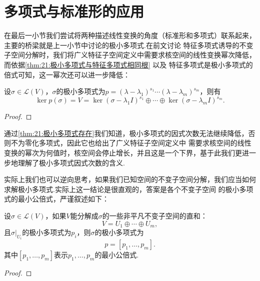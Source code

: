 \section{多项式与标准形的应用}
在最后一小节我们尝试将两种描述线性变换的角度（标准形和多项式）联系起来，主要的桥梁就是上一小节中讨论的极小多项式.在前文讨论
特征多项式诱导的不变子空间分解时，我们将广义特征子空间定义中需要求核空间的线性变换幂次降低，而依据\autoref{thm:21:极小多项式与特征多项式相同根} 以及
特征多项式是极小多项式的倍式可知，这一幂次还可以进一步降低：
\begin{theorem} \label{thm:21:极小多项式与分解}
    设$\sigma\in \mathcal{L}(V)$，$\sigma$的极小多项式为$p=(\lambda-\lambda_1)^{s_1}\cdots(\lambda-\lambda_m)^{s_m}$，则有
    \[\ker p(\sigma)=V=\ker (\sigma-\lambda_1I)^{s_1}\oplus\cdots\oplus\ker (\sigma-\lambda_mI)^{s_m}.\]
\end{theorem}
\begin{proof}
    
\end{proof}

通过\autoref{thm:21:极小多项式存在}我们知道，极小多项式的因式次数无法继续降低，否则不为零化多项式，因此它也给出了广义特征子空间定义中
需要求核空间的线性变换的幂次为何值时，核空间会停止增长，并且这是一个下界，基于此我们更进一步地理解了极小多项式因式次数的含义.

实际上我们也可以逆向思考，如果我们已知空间的不变子空间分解，我们应当如何求解极小多项式.实际上这一结论是很直观的，答案是各个不变子空间
的极小多项式的最小公倍式，严谨叙述如下：
\begin{theorem}
    设$\sigma\in\mathcal{L}(V)$，如果$V$能分解成$\sigma$的一些非平凡不变子空间的直和：
    \[V=U_1\oplus\cdots\oplus U_m,\]
    且$\sigma\vert_{U_i}$的极小多项式为$p_i$，则$\sigma$的极小多项式为
    \[p=[p_1,\ldots,p_m].\]
    其中$[p_1,\ldots,p_m]$表示$p_1,\ldots,p_m$的最小公倍式.
\end{theorem}
\begin{proof}
    
\end{proof}

